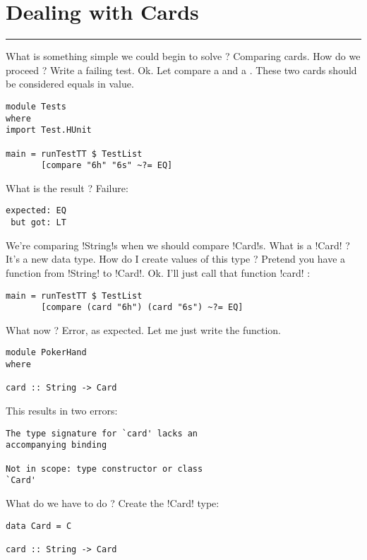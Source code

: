 \newpage
\section{Dealing with Cards} %
\vspace{10cm}
\hrule

\lhQ What is something simple we could begin to solve ?
\lhA Comparing cards.
\lhN How do we proceed ?
\lhA Write a failing test.
\lhN Ok. Let compare a  and a . These two cards should be considered equals in value.
\begin{lstlisting}[frame=single]
module Tests
where 
import Test.HUnit

main = runTestTT $ TestList 
       [compare "6h" "6s" ~?= EQ]
\end{lstlisting} %
What is the result ?
\lhA \failure Failure: 
\begin{verbatim}
expected: EQ
 but got: LT
\end{verbatim}
We're comparing \il!String!s when we should compare \il!Card!s.
\lhN What is a \il!Card! ?
\lhA It's a new data type.
\lhN How do I create values of this type ?
\lhA Pretend you have a function from \il!String! to \il!Card!.
\lhN Ok. I'll just call that function \il!card! :
\begin{lstlisting}[frame=single]
main = runTestTT $ TestList 
       [compare (card "6h") (card "6s") ~?= EQ] 
\end{lstlisting} %
What now ?
\lhA \error Error, as expected. Let me just write the function.
\begin{lstlisting}[frame=single]
module PokerHand
where

card :: String -> Card
\end{lstlisting}
\lhN \error This results in two errors: 
\begin{verbatim}
The type signature for `card' lacks an 
accompanying binding

Not in scope: type constructor or class 
`Card'
\end{verbatim}
What do we have to do ?
\lhA \error Create the \il!Card! type:
\begin{lstlisting}[frame=single]
data Card = C 

card :: String -> Card
\end{lstlisting}
